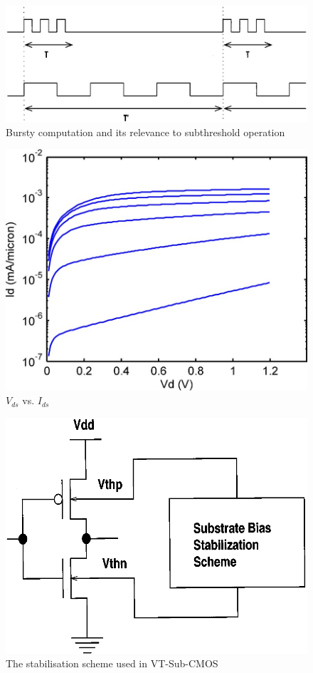 \begin{figure}
	\centering
	\includegraphics[width=\columnwidth]{../../images/burstycomputation.png}
	\caption{Bursty computation and its relevance to subthreshold operation \cite{IEEEVLSIRobustSTL}}
	\label{fig:burstST}
\end{figure}

\begin{figure}
	\centering
	\includegraphics[width=0.5\columnwidth]{../../images/vgsvsids.png}
	\caption{$V_{ds}$ vs. $I_{ds}$ \cite{SemiEmpiricalModels}}
	\label{fig:VgsIds}
\end{figure}

\begin{figure}
	\centering
	\includegraphics[width=0.5\columnwidth]{../../images/vtsubcmos.png}
	\caption{The stabilisation scheme used in VT-Sub-CMOS \cite{IEEEVLSIRobustSTL}}
	\label{fig:vtsubcmos}
\end{figure}
